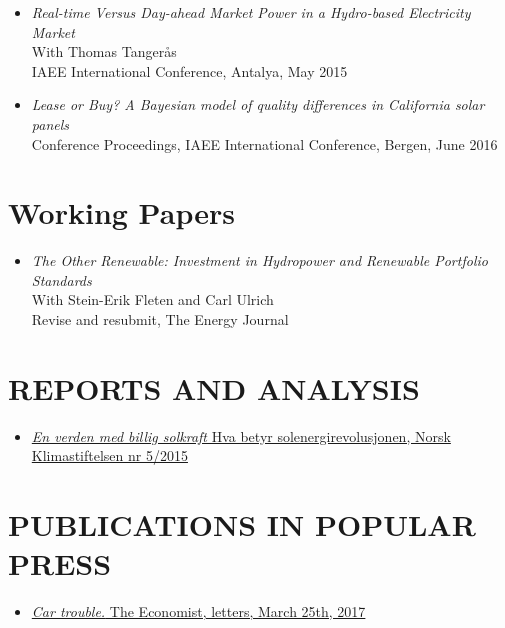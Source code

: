\documentclass[margin]{res}
\begin{document}
\begin{resume}
\begin{itemize}
\item[] \emph{Real-time Versus Day-ahead Market Power in a Hydro-based Electricity Market} \\ 
With Thomas Tanger\aa s \\
IAEE International Conference, Antalya, May 2015

\item[] \emph{Lease or Buy? A Bayesian model of quality differences in California solar panels}\\
Conference Proceedings, IAEE International Conference, Bergen, June 2016

\end{itemize}


\normalsize{\section{Working Papers}}
\begin{itemize}  
\setlength{\itemsep}{10pt}

\item[] \emph{The Other Renewable: Investment in Hydropower and Renewable Portfolio Standards}\\
With Stein-Erik Fleten and Carl Ulrich \\
Revise and resubmit, The Energy Journal

\end{itemize}

\section{REPORTS AND ANALYSIS} 
\begin{itemize} 
\setlength{\itemsep}{5pt}
\item[] \href{http://klimastiftelsen.no/wp-content/uploads/2015/06/NK5_2015_Solenergirevolusjonen.pdf}{\emph{En verden med billig solkraft} Hva betyr solenergirevolusjonen, Norsk Klimastiftelsen nr 5/2015} 
\end{itemize}

\section{PUBLICATIONS IN POPULAR PRESS} 
\begin{itemize} 
\setlength{\itemsep}{5pt}

\item[] \href{https://www.economist.com/news/letters/21719426-liberia-charles-murray-france-turkey-electric-cars-dead-words-letters-editor}{\emph{Car trouble.} The Economist, letters, March 25th, 2017}


\end{itemize}
\end{resume}
\end{document}
